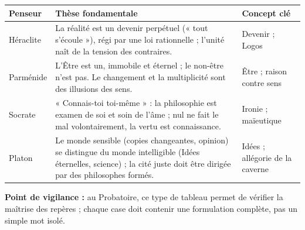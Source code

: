 \documentclass[11pt]{article}
\newcommand{\cle}[1]{{\popxbold\color{popdark}#1}}
\begin{document}
\begin{corrige}
\begin{center}
\begin{tabularx}{\linewidth}{|l|X|X|}
\hline
\rowcolor{popblueL} \textbf{Penseur} & \textbf{Thèse fondamentale} & \textbf{Concept clé} \\
\hline
Héraclite & La réalité est un devenir perpétuel (« tout s'écoule »), régi par une loi rationnelle ; l'unité naît de la tension des contraires. & \cle{Devenir} ; \cle{Logos} \\
\hline
Parménide & L'Être est un, immobile et éternel ; le non-être n'est pas. Le changement et la multiplicité sont des illusions des sens. & \cle{Être} ; raison contre sens \\
\hline
Socrate & « Connais-toi toi-même » : la philosophie est examen de soi et soin de l'âme ; nul ne fait le mal volontairement, la vertu est connaissance. & \cle{Ironie} ; \cle{maïeutique} \\
\hline
Platon & Le monde sensible (copies changeantes, opinion) se distingue du monde intelligible (Idées éternelles, science) ; la cité juste doit être dirigée par des philosophes formés. & \cle{Idées} ; allégorie de la caverne \\
\hline
\end{tabularx}
\end{center}
\textbf{Point de vigilance :} au Probatoire, ce type de tableau permet de vérifier la maîtrise des repères ; chaque case doit contenir une formulation complète, pas un simple mot isolé.
\end{corrige}
\end{document}
